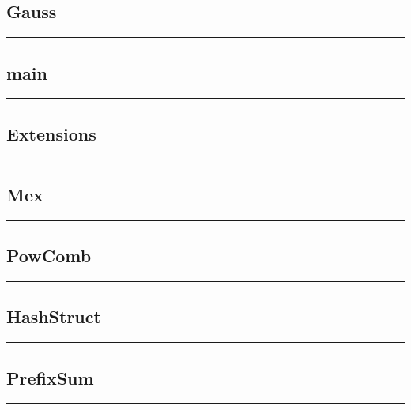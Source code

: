 \documentclass{article}
\begin{document}
\begin{landscape}
\begin{multicols}{2}
\subsection{Gauss}
\vspace{0.2cm}
\hrule

\subsection{main}
\vspace{0.2cm}
\hrule

\subsection{Extensions}
\vspace{0.2cm}
\hrule

\subsection{Mex}
\vspace{0.2cm}
\hrule

\subsection{PowComb}
\vspace{0.2cm}
\hrule

\subsection{HashStruct}
\vspace{0.2cm}
\hrule

\subsection{PrefixSum}
\vspace{0.2cm}
\hrule

\end{multicols}
\end{landscape}
\end{document}

